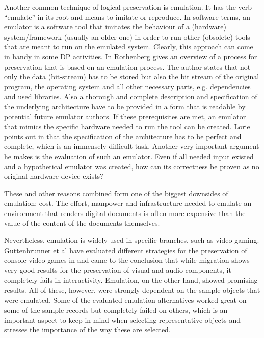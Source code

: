 Another common technique of logical preservation is emulation. It has the verb ``emulate'' in its root and means to imitate or reproduce.
In software terms, an emulator is a software tool that imitates the behaviour of a (hardware) system/framework (usually an older one) in order to run other (obsolete) tools that are meant to run on the emulated system. Clearly, this approach can come in handy in some DP activities.
In \cite{rothenberg:1999:ensuring} Rothenberg gives an overview of a process for preservation that is based on an emulation process. The author states that not only the data (bit-stream) has to be stored but also the bit stream of the original program, the operating system and all other necessary parts, e.g. dependencies and used libraries. Also a thorough and complete description and specification of the underlying architecture have to be provided in a form that is readable by potential future emulator authors. If these prerequisites are met, an emulator that mimics the specific hardware needed to run the tool can be created.
Lorie points out in \cite{Lorie:2001:LTP:379437.379726} that the specification of the architecture has to be perfect and complete, which is an immensely difficult task. Another very important argument he makes is the evaluation of such an emulator. Even if all needed input existed and a hypothetical emulator was created, how can its correctness be proven as no original hardware device exists?

These and other reasons combined form one of the biggest downsides of emulation; cost. The effort, manpower and infrastructure needed to emulate an environment that renders digital documents is often more expensive than the value of the content of the documents themselves.

Nevertheless, emulation is widely used in specific branches, such as video gaming.
Guttenbrunner et al have evaluated different strategies for the preservation of console video games in \cite{guttenbrunner:2008:evaluating} and came to the conclusion that while migration shows very good results for the preservation of visual and audio components, it completely fails in interactivity. Emulation, on the other hand, showed promising results. All of these, however, were strongly dependent on the sample objects that were emulated. Some of the evaluated emulation alternatives worked great on some of the sample records but completely failed on others, which is an important aspect to keep in mind when selecting representative objects and stresses the importance of the way these are selected.

